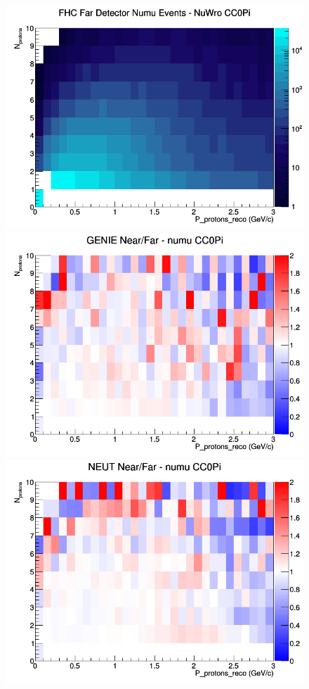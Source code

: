 \begin{figure}[h]
\endminipage
{}
\includegraphics[width=\linewidth]{eff_N_P/LAr/protons/CC0Pi_FHC_FD_numu_N_P_NuWro.png}
\endminipage
\newline
{}
\includegraphics[width=\linewidth]{eff_N_P/LAr/protons/ratios/CC0Pi_GENIE_numu_NF_N_P.png}
\endminipage
{}
\includegraphics[width=\linewidth]{eff_N_P/LAr/protons/ratios/CC0Pi_NEUT_numu_NF_N_P.png}

\end{figure}
